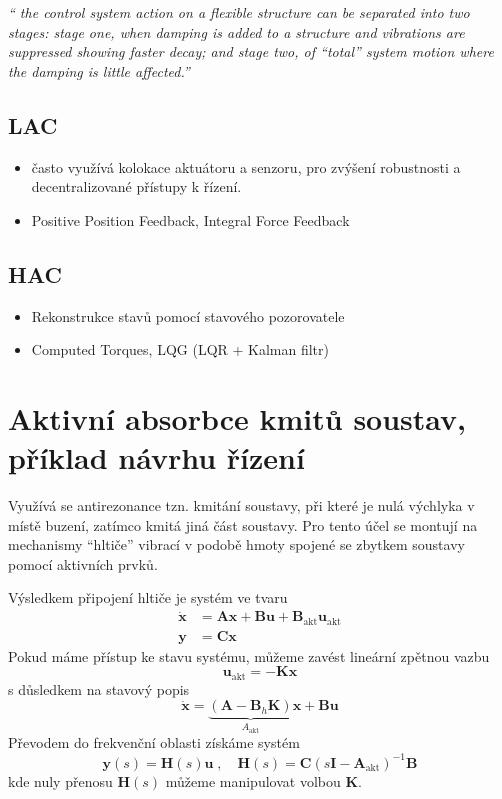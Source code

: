 \documentclass{article}
\begin{document}
	\emph{`` the control system action on a flexible structure can be separated into two stages: stage one, when damping is added to a structure and vibrations are suppressed showing faster decay; and stage two, of “total” system motion where the damping is little affected.''}
	
	\subsection*{LAC}
	\begin{itemize}
		\item často využívá kolokace aktuátoru a senzoru, pro zvýšení robustnosti a decentralizované přístupy k řízení.
		\item Positive Position Feedback, Integral Force Feedback
	\end{itemize}

	\subsection*{HAC}
	\begin{itemize}
		\item Rekonstrukce stavů pomocí stavového pozorovatele
		\item Computed Torques, LQG (LQR + Kalman filtr)
	\end{itemize}

	\section{Aktivní absorbce kmitů soustav, příklad návrhu řízení}
	
	Využívá se antirezonance tzn. kmitání soustavy, při které je nulá výchlyka v místě buzení, zatímco kmitá jiná část soustavy. Pro tento účel se montují na mechanismy ``hltiče'' vibrací v podobě hmoty spojené se zbytkem soustavy pomocí aktivních prvků.

	Výsledkem připojení hltiče je systém ve tvaru
	\begin{align}
		\bm{\dot{x}} &= \bm{A}\bm{x} + \bm{B}\bm{u} + \bm{B}_\text{akt} \bm{u}_\text{akt} \\
		\bm{y} &= \bm{C}\bm{x}
	\end{align}
	Pokud máme přístup ke stavu systému, můžeme zavést lineární zpětnou vazbu
	\begin{equation}
		\bm{u}_\text{akt} = -\bm{K}\bm{x}
	\end{equation}
	s důsledkem na stavový popis
	\begin{equation}
		\bm{\dot{x}} = \underbrace{(\bm{A}-\bm{B}_h\bm{K})}_{A_\text{akt}}\bm{x} + \bm{B}\bm{u}
	\end{equation}
	Převodem do frekvenční oblasti získáme systém
	\begin{equation}
	\bm{y}(s) = \bm{H}(s)\bm{u}
	\;,\quad 
	\bm{H}(s) = \bm{C}(s\bm{I}-\bm{A}_\text{akt})^{-1}\bm{B}
	\end{equation}
	kde nuly přenosu $\bm{H}(s)$ můžeme manipulovat volbou $\bm{K}$.
\end{document}
